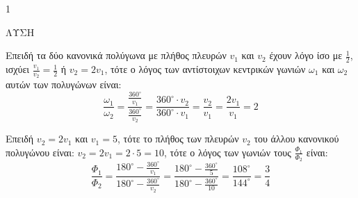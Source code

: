\begin{ylh}{1}
    \item [Ύλη από εικόνα]
\end{ylh}
ΛΥΣΗ

\begin{alist}
\item Επειδή τα δύο κανονικά πολύγωνα με πλήθος πλευρών $v_1$ και $v_2$ έχουν λόγο ίσο με $\frac{1}{2}$, ισχύει $\frac{v_1}{v_2} = \frac{1}{2}$ ή $v_2 = 2v_1$, τότε ο λόγος των αντίστοιχων κεντρικών γωνιών $\omega_1$ και $\omega_2$ αυτών των πολυγώνων είναι:
\[
\frac{\omega_1}{\omega_2} = \frac{\frac{360^\circ}{v_1}}{\frac{360^\circ}{v_2}} = \frac{360^\circ \cdot v_2}{360^\circ \cdot v_1} = \frac{v_2}{v_1} = \frac{2v_1}{v_1} = 2
\]

\item Επειδή $v_2 = 2v_1$ και $v_1 = 5$, τότε το πλήθος των πλευρών $v_2$ του άλλου κανονικού πολυγώνου είναι: $v_2 = 2v_1 = 2 \cdot 5 = 10$, τότε ο λόγος των γωνιών τους $\frac{\Phi_1}{\Phi_2}$ είναι:
\[
\frac{\Phi_1}{\Phi_2} = \frac{180^\circ - \frac{360^\circ}{v_1}}{180^\circ - \frac{360^\circ}{v_2}} = \frac{180^\circ - \frac{360^\circ}{5}}{180^\circ - \frac{360^\circ}{10}} = \frac{108^\circ}{144^\circ} = \frac{3}{4}
\]
\end{alist}